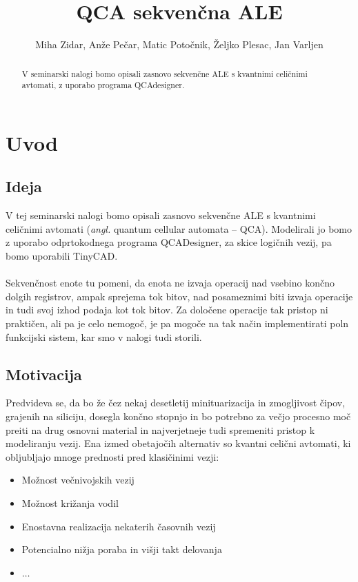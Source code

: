 \documentclass[seminar, slovene]{FRIreport}
\newcommand{\angl}[1]{(\textit{angl.} #1)}
\begin{document}
\title{QCA sekven\v cna ALE}

\author{Miha Zidar, Anže Pečar, Matic Potočnik, Željko Plesac, Jan Varljen}

\address{Skupina 2 in 4}

\begin{abstract}
V seminarski nalogi bomo opisali zasnovo sekvenčne ALE s kvantnimi celičnimi avtomati, z uporabo programa QCAdesigner.

\end{abstract}

%
\section{Uvod}
\subsection{Ideja}
V tej seminarski nalogi bomo opisali zasnovo sekvenčne ALE s kvantnimi celičnimi avtomati \angl{quantum cellular automata -- QCA}. Modelirali jo bomo z uporabo odprtokodnega programa QCADesigner\cite{walus:2004}, za skice logičnih vezij, pa bomo uporabili TinyCAD.
\ \\ \ \\
Sekvenčnost enote tu pomeni, da enota ne izvaja operacij nad vsebino končno dolgih registrov, ampak sprejema tok bitov, nad posameznimi biti izvaja operacije in tudi svoj izhod podaja kot tok bitov. Za določene operacije tak pristop ni praktičen, ali pa je celo nemogoč, je pa mogoče na tak način implementirati poln funkcijski sistem, kar smo v nalogi tudi storili.

\subsection{Motivacija}
Predvideva se, da bo že čez nekaj desetletij minituarizacija in zmogljivost čipov, grajenih na siliciju, dosegla končno stopnjo in bo potrebno za večjo procesno moč preiti na drug osnovni material in najverjetneje tudi spremeniti pristop k modeliranju vezij. Ena izmed obetajočih alternativ so kvantni celični avtomati, ki obljubljajo mnoge prednosti pred klasičinimi vezji:
\begin{itemize}
\item Možnost večnivojskih vezij
\item Možnost križanja vodil
\item Enostavna realizacija nekaterih časovnih vezij
\item Potencialno nižja poraba in višji takt delovanja
\item $\dots$
\end{itemize}
\end{document}
